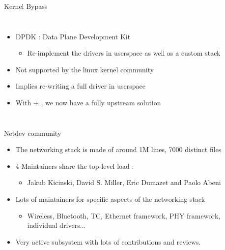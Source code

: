 \begin{frame}{Kernel Bypass}
\begin{columns}
\begin{itemize}
		\item DPDK : Data Plane Development Kit
			\begin{itemize}
				\item Re-implement the drivers in userspace as well as a custom stack
			\end{itemize}
		\item Not supported by the linux kernel community
		\item Implies re-writing a full driver in userspace
		\item With  + , we now have a fully upstream solution
	\end{itemize}
	\end{columns}
\end{frame}

\begin{frame}{Netdev community}
	\begin{itemize}
		\item The networking stack is made of around 1M lines, 7000 distinct files
		\item 4 Maintainers share the top-level load :
			\begin{itemize}
				\item Jakub Kicinski, David S. Miller, Eric Dumazet and Paolo Abeni
			\end{itemize}
		\item Lots of maintainers for specific aspects of the networking stack
			\begin{itemize}
				\item Wireless, Bluetooth, TC, Ethernet framework, PHY framework, individual drivers...
			\end{itemize}
		\item Very active subsystem with lots of contributions and reviews.
	\end{itemize}
\end{frame}

